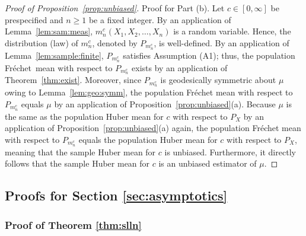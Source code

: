 \documentclass[preprint]{imsart}
\def\Frechet{Fr\'{e}chet}
\theoremstyle{plain}
\theoremstyle{remark}
\begin{document}
\begin{appendix}
\begin{proof}[Proof of Proposition~\ref{prop:unbiased}]
Proof for Part (b). Let $c \in [0, \infty]$ be prespecified and $n \ge 1$ be a fixed integer. By an application of Lemma~\ref{lem:sam:meas}, $m^{c}_{n}(X_{1}, X_{2}, \ldots, X_{n})$ is a random variable. Hence, the distribution (law) of $m^{c}_{n}$, denoted by $P_{m^{c}_{n}}$, is well-defined. By an application of Lemma~\ref{lem:sample:finite}, $P_{m^{c}_{n}}$ satisfies Assumption (A1); thus, the population \Frechet\ mean with respect to $P_{m^{c}_{n}}$ exists by an application of Theorem~\ref{thm:exist}. Moreover, since $P_{m^{c}_{n}}$ is geodesically symmetric about $\mu$ owing to Lemma~\ref{lem:geo:symm}, the population Fr\'{e}chet mean with respect to $P_{m^{c}_{n}}$ equals $\mu$ by an application of Proposition~\ref{prop:unbiased}(a). Because $\mu$ is the same as the population Huber mean for $c$ with respect to $P_{X}$ by an application of Proposition~\ref{prop:unbiased}(a) again, the population Fr\'{e}chet mean with respect to $P_{m^{c}_{n}}$ equals the population Huber mean for $c$ with respect to $P_{X}$, meaning that the sample Huber mean for $c$ is unbiased. Furthermore, it directly follows that the sample Huber mean for $c$ is an unbiased estimator of $\mu$. 
\end{proof}






\color{black}
\subsection{Proofs for Section \ref{sec:asymptotics}}



\subsubsection{Proof of Theorem \ref{thm:slln}}




\end{appendix}
\end{document}
